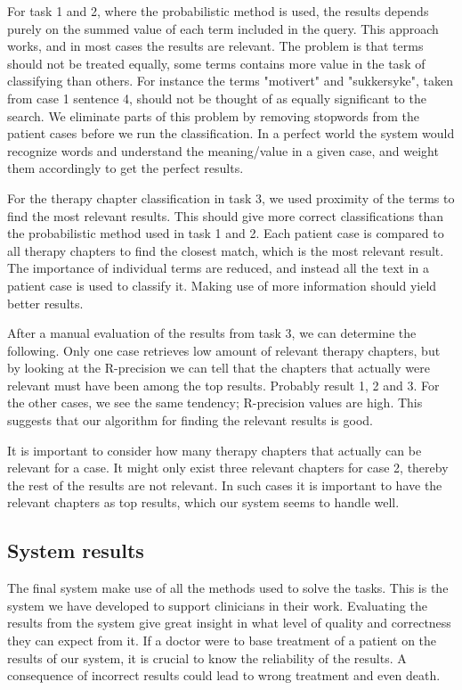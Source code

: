 For task 1 and 2, where the probabilistic method is used, the results depends purely on the summed value of each term included in the query. This approach works, and in most cases the results are relevant. The problem is that terms should not be treated equally, some terms contains more value in the task of classifying than others. For instance the terms "motivert" and "sukkersyke", taken from case 1 sentence 4, should not be thought of as equally significant to the search. We eliminate parts of this problem by removing stopwords from the patient cases before we run the classification. In a perfect world the system would recognize words and understand the meaning/value in a given case, and weight them accordingly to get the perfect results. 

For the therapy chapter classification in task 3, we used proximity of the terms to find the most relevant results. This should give more correct classifications than the probabilistic method used in task 1 and 2. Each patient case is compared to all therapy chapters to find the closest match, which is the most relevant result. The importance of individual terms are reduced, and instead all the text in a patient case is used to classify it. Making use of more information should yield better results.

After a manual evaluation of the results from task 3, we can determine the following. Only one case retrieves low amount of relevant therapy chapters, but by looking at the R-precision we can tell that the chapters that actually were relevant must have been among the top results. Probably result 1, 2 and 3. For the other cases, we see the same tendency; R-precision values are high. This suggests that our algorithm for finding the relevant results is good. 

It is important to consider how many therapy chapters that actually can be relevant for a case. It might only exist three relevant chapters for case 2, thereby the rest of the results are not relevant. In such cases it is important to have the relevant chapters as top results, which our system seems to handle well.

\subsection{System results}
The final system make use of all the methods used to solve the tasks. This is the system we have developed to support clinicians in their work. Evaluating the results from the system give great insight in what level of quality and correctness they can expect from it. If a doctor were to base treatment of a patient on the results of our system, it is crucial to know the reliability of the results. A consequence of incorrect results could lead to wrong treatment and even death.

